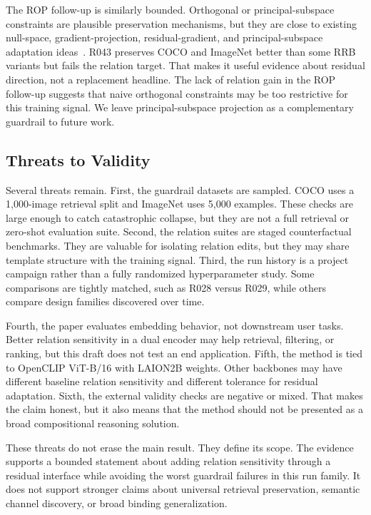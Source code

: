 The ROP follow-up is similarly bounded. Orthogonal or principal-subspace constraints are plausible preservation mechanisms, but they are close to existing null-space, gradient-projection, residual-gradient, and principal-subspace adaptation ideas~\cite{peng2025gnsp,luo2026keeplora,qiao2024pegp,wu2026psoft,lu2024vptnullspace}. R043 preserves COCO and ImageNet better than some RRB variants but fails the relation target. That makes it useful evidence about residual direction, not a replacement headline. The lack of relation gain in the ROP follow-up suggests that naive orthogonal constraints may be too restrictive for this training signal. We leave principal-subspace projection as a complementary guardrail to future work.

\subsection{Threats to Validity}

Several threats remain. First, the guardrail datasets are sampled. COCO uses a 1,000-image retrieval split and ImageNet uses 5,000 examples. These checks are large enough to catch catastrophic collapse, but they are not a full retrieval or zero-shot evaluation suite. Second, the relation suites are staged counterfactual benchmarks. They are valuable for isolating relation edits, but they may share template structure with the training signal. Third, the run history is a project campaign rather than a fully randomized hyperparameter study. Some comparisons are tightly matched, such as R028 versus R029, while others compare design families discovered over time.

Fourth, the paper evaluates embedding behavior, not downstream user tasks. Better relation sensitivity in a dual encoder may help retrieval, filtering, or ranking, but this draft does not test an end application. Fifth, the method is tied to OpenCLIP ViT-B/16 with LAION2B weights. Other backbones may have different baseline relation sensitivity and different tolerance for residual adaptation. Sixth, the external validity checks are negative or mixed. That makes the claim honest, but it also means that the method should not be presented as a broad compositional reasoning solution.

These threats do not erase the main result. They define its scope. The evidence supports a bounded statement about adding relation sensitivity through a residual interface while avoiding the worst guardrail failures in this run family. It does not support stronger claims about universal retrieval preservation, semantic channel discovery, or broad binding generalization.

